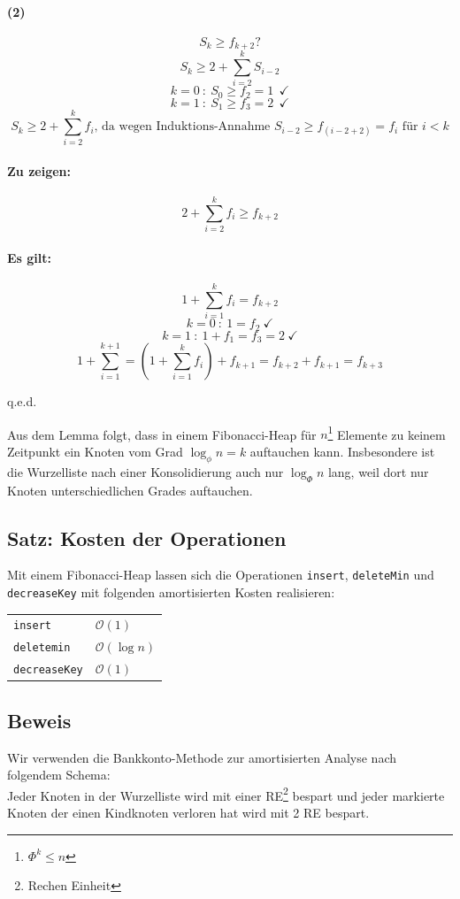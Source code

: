 \paragraph{(2)}
\[ S_k \geq f_{k+2} \text{?}\]
\[ S_k\geq 2+\sum_{i=2}^{k}S_{i-2} \]
\[ k=0~:~S_0\geq f_2=1~~\checkmark \]
\[ k=1~:~S_1\geq f_3=2~~\checkmark \]
\[ S_k \geq 2+\sum_{i=2}^{k}f_i\text{, da wegen Induktions-Annahme }S_{i-2}\geq f_{(i-2+2)}=f_i \text{ für }i<k \]
\paragraph{Zu zeigen:}
\[ 2 + \sum_{i=2}^{k}f_i \geq f_{k+2} \]
\paragraph{Es gilt:}
\[ 1+\sum_{i=1}^{k}f_i=f_{k+2} \]
\[ k=0~:~1=f_2~\checkmark \]
\[ k=1~:~1+f_1=f_3=2~\checkmark \]
\[ 1+\sum_{i=1}^{k+1} = (1+\sum_{i=1}^{k}f_i)+f_{k+1} = f_{k+2}+f_{k+1}=f_{k+3} \]
\begin{flushright}
	q.e.d.
\end{flushright}

Aus dem Lemma folgt, dass in einem Fibonacci-Heap für $n$\footnote{$\Phi^k\leq n$} Elemente zu keinem Zeitpunkt ein Knoten vom Grad $\log_\phi n = k$ auftauchen kann. Insbesondere ist die Wurzelliste nach einer Konsolidierung auch nur $\log_\Phi n$ lang, weil dort nur Knoten unterschiedlichen Grades auftauchen. 


\pagebreak

\subsection{Satz: Kosten der Operationen}
Mit einem Fibonacci-Heap lassen sich die Operationen \texttt{insert}, \texttt{deleteMin} und \texttt{decreaseKey} mit folgenden amortisierten Kosten realisieren:\\
\begin{tabular}{ll}
	\texttt{insert}&$\mathcal{O}(1)$\\
	\texttt{deletemin}&$\mathcal{O}(\log n)$\\
	\texttt{decreaseKey}&$\mathcal{O}(1)$
\end{tabular} 

\subsection{Beweis}
Wir verwenden die Bankkonto-Methode zur amortisierten Analyse nach folgendem Schema:\\
Jeder Knoten in der Wurzelliste wird mit einer RE\footnote{Rechen Einheit} bespart und jeder markierte Knoten der einen Kindknoten verloren hat wird mit 2 RE bespart.
